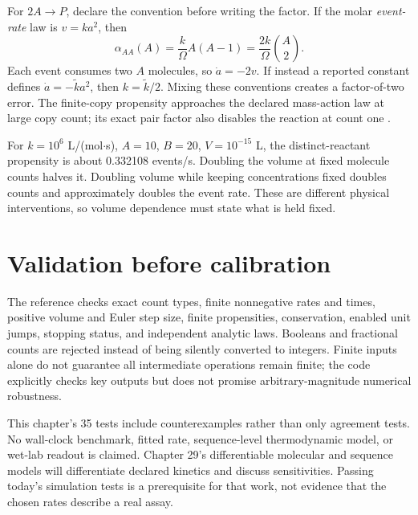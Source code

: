 For $2A\to P$, declare the convention before writing the factor.
If the molar \emph{event-rate} law is $v=k a^2$, then
\[
\alpha_{AA}(A)=\frac{k}{\Omega}A(A-1)
=\frac{2k}{\Omega}\binom A2.
\]
Each event consumes two $A$ molecules, so $\dot a=-2v$.
If instead a reported constant defines $\dot a=-\widetilde k a^2$, then
$k=\widetilde k/2$. Mixing these conventions creates a factor-of-two error.
The finite-copy propensity approaches the declared mass-action law at large
copy count; its exact pair factor also disables the reaction at count one
\cite{higham2008}.

For $k=10^6$ L/(mol$\cdot$s), $A=10$, $B=20$, $V=10^{-15}$ L,
the distinct-reactant propensity is about 0.332108 events/s. Doubling the volume
at fixed molecule counts halves it. Doubling volume while keeping concentrations
fixed doubles counts and approximately doubles the event rate. These are
different physical interventions, so volume dependence must state what is held fixed.

\section{Validation before calibration}
The reference checks exact count types, finite nonnegative rates and times,
positive volume and Euler step size, finite propensities, conservation, enabled
unit jumps, stopping status, and independent analytic laws. Booleans and fractional
counts are rejected instead of being silently converted to integers.
Finite inputs alone do not guarantee all intermediate operations remain finite;
the code explicitly checks key outputs but does not promise arbitrary-magnitude
numerical robustness.

This chapter's 35 tests include counterexamples rather than only agreement tests.
No wall-clock benchmark, fitted rate, sequence-level thermodynamic model, or wet-lab
readout is claimed. Chapter 29's differentiable molecular and sequence models will
differentiate declared kinetics and discuss sensitivities. Passing today's
simulation tests is a prerequisite for that work, not evidence that the chosen
rates describe a real assay.

